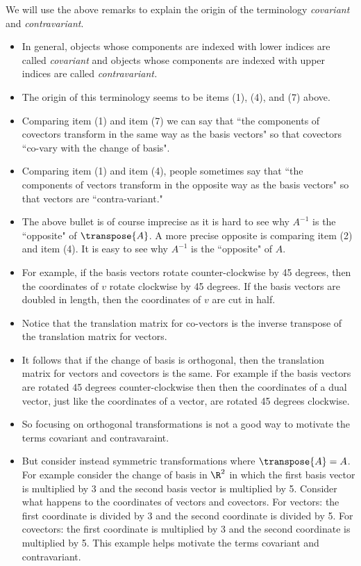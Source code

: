 \documentclass[oneside,12pt]{amsart}
\begin{document}
\begin{remark}
We will use the above remarks to explain the origin of the terminology \emph{covariant} and \emph{contravariant}.
\begin{itemize}
\item In general, objects whose components are indexed with lower indices are called \emph{covariant} and
objects whose components are indexed with upper indices are called \emph{contravariant.}
\item The origin of this terminology seems to be items (1), (4), and (7) above. 
\item Comparing item (1) and item (7)
we can say that ``the components of covectors transform in the same way as the basis vectors" so that
covectors ``co-vary with the change of basis". 
\item Comparing item (1) and item (4), people sometimes say that
``the components of vectors transform in the opposite way as the basis vectors" so that vectors are ``contra-variant."
\item The above bullet is of course imprecise as it is hard to see why $A^{-1}$ is the ``opposite" of  $\transpose{A}$.
A more precise opposite is comparing item (2) and item (4). It is easy to see why 
$A^{-1}$ is the ``opposite" of $A$.
\item For example,
if the basis vectors rotate counter-clockwise by 45 degrees, then the coordinates of $v$ rotate clockwise by 45 degrees.
If the basis vectors are doubled in length, then the coordinates of $v$ are cut in half.
\item Notice that the translation matrix for co-vectors is the inverse transpose of the translation matrix
for vectors.
\item It follows that if the change of basis is orthogonal, then the translation matrix for
vectors and covectors is the same. For example if the basis vectors are rotated 45 degrees counter-clockwise then
then the coordinates of a dual vector, just like the coordinates of a vector, are rotated 45 degrees clockwise.
\item So focusing on orthogonal transformations is not a good way to motivate the terms
covariant and contravaraint.
\item But consider instead symmetric transformations where $\transpose{A} = A$. For example consider
the change of basis in $\R^2$ in which the first basis vector is multiplied by 3 and the second
basis vector is multiplied by 5. Consider what happens to the coordinates of vectors and covectors.
For vectors: the first coordinate is divided by 3 and the second coordinate is divided by 5.
For covectors: the first coordinate is multiplied by 3 and the second coordinate is multiplied by 5.
This example helps motivate the terms covariant and contravariant.
\end{itemize}
\end{remark}
\end{document}
